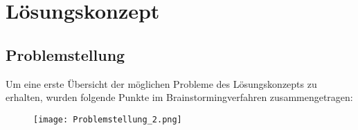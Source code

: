 \section{Lösungskonzept} \label{sec:loesungskonzept}
\subsection{Problemstellung} \label{subsec:problemstellung}
Um eine erste Übersicht der möglichen Probleme des Lösungskonzepts zu erhalten, wurden folgende Punkte im Brainstormingverfahren zusammengetragen:
\begin{figure}[H]
	\centering
	\texttt{[image: Problemstellung\_2.png]}
	\label{fig:Figure}
\end{figure}
\newpage















